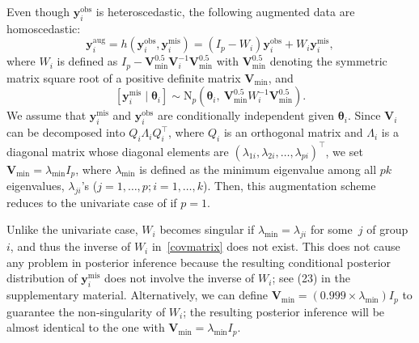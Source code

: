 \documentclass[12pt]{article}
\begin{document}
Even though $\boldsymbol{y}_i^{\textrm{obs}}$ is heteroscedastic, the following augmented data are homoscedastic:
\begin{equation}\label{multivariatedata transforming augmentation}
\boldsymbol{y}_i^{\textrm{aug}}=h(\boldsymbol{y}_i^{\textrm{obs}}, \boldsymbol{y}_i^{\textrm{mis}})=(I_p - W_i) \boldsymbol{y}_i^{\textrm{obs}}+W_i\boldsymbol{y}_i^{\textrm{mis}},
\end{equation}
where $W_i$ is defined as  $I_p - \boldsymbol{V}_{\textrm{min}}^{0.5}\boldsymbol{V}^{-1}_i\boldsymbol{V}_{\textrm{min}}^{0.5}$  with $\boldsymbol{V}_{\textrm{min}}^{0.5}$ denoting the symmetric matrix square root of a positive definite matrix $\boldsymbol{V}\!_{\textrm{min}}$, and 
\begin{equation}\label{covmatrix}
[\boldsymbol{y}_{i}^{\textrm{mis}}\mid \boldsymbol{\theta}_i]\sim \textrm{N}_p(\boldsymbol{\theta}_i,~ \boldsymbol{V}_{\textrm{min}}^{0.5}W_i^{-1}\boldsymbol{V}_{\textrm{min}}^{0.5}).
\end{equation}
We assume that $\boldsymbol{y}_{i}^{\textrm{mis}}$ and $\boldsymbol{y}_{i}^{\textrm{obs}}$ are conditionally independent given $\boldsymbol{\theta}_i$. Since $\boldsymbol{V}\!_i$ can be decomposed into $Q_i\Lambda_iQ_i^{\top}$, where $Q_i$ is an orthogonal matrix and $\Lambda_i$ is a diagonal matrix whose diagonal elements are $(\lambda_{1i}, \lambda_{2i}, \ldots, \lambda_{pi})^{\top}$, we set $\boldsymbol{V}\!_{\textrm{min}}=\lambda_{\min}I_p$, where $\lambda_{\min}$ is defined as the minimum eigenvalue among all $pk$ eigenvalues, $\lambda_{ji}$'s ($j=1, \ldots, p; i=1, \ldots, k$). Then, this augmentation scheme reduces to the univariate case of \cite{kelly2014advances} if $p=1$.  

Unlike the univariate case, $W_i$ becomes singular if $\lambda_{\min}=\lambda_{ji}$ for some~$j$ of group $i$, and thus the inverse of $W_i$ in~\eqref{covmatrix} does not exist. This does not cause any problem in posterior inference because the resulting conditional posterior distribution of $\boldsymbol{y}_{i}^{\textrm{mis}}$ does not involve the inverse of $W_i$; see (23) in the supplementary material. Alternatively, we can define $\boldsymbol{V}\!_{\textrm{min}}=(0.999\times \lambda_{\min})I_p$ to guarantee the non-singularity of $W_i$; the resulting posterior inference will be almost identical to the one with $\boldsymbol{V}\!_{\textrm{min}}=\lambda_{\min}I_p$.
\end{document}
